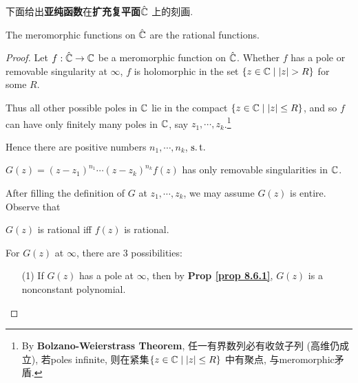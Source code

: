 	\vspace{2em}
	下面给出\textbf{亚纯函数}在\textbf{扩充复平面$\hat{\mathbb{C}}$} 上的刻画.
	\begin{thm}\label{thm 9.1.1}
		The meromorphic functions on $\hat{\mathbb{C}}$ are the rational functions.
		
		\vspace{4em}
		\begin{proof}
			Let $f : \hat{\mathbb{C}} \rightarrow \mathbb{C}$ be a meromorphic function on $\hat{\mathbb{C}}$. Whether $f$ has a pole or removable singularity at $\infty$, $f$ is holomorphic in the set $\{ z \in \mathbb{C} \mid \left| z \right| > R \}$ for some $R$. 
			
			\vspace{1em}
			
			Thus all other possible poles in $\mathbb{C}$ lie in the compact $\{ z \in \mathbb{C} \mid \left| z \right| \leq R \}$, and so $f$ can have only finitely many poles in $\mathbb{C}$, say $z_1 , \cdots , z_k$.\footnote{By \textbf{Bolzano-Weierstrass Theorem}, 任一有界数列必有收敛子列 (高维仍成立), 若poles infinite, 则在紧集$\{ z \in \mathbb{C} \mid \left| z \right| \leq R \}$ 中有聚点, 与meromorphic矛盾.}
			
			\newpage
			
			Hence there are positive numbers $n_1 , \cdots , n_k$, $\operatorname{s.t.}$
			\begin{center}
				$G(z) = (z - z_1)^{n_1} \cdots (z - z_k)^{n_k} f(z)$ has only removable singularities in $\mathbb{C}$.
			\end{center}
		
			\vspace{1em}
			
			After filling the definition of $G$ at $z_1 , \cdots , z_k$, we may assume $G(z)$ is entire. Observe that 
			\begin{center}
				$G(z)$ is rational \hspace*{1em} iff \hspace*{1em} $f(z)$ is rational.
			\end{center}
			For $G(z)$ at $\infty$, there are 3 possibilities:
			
			\vspace{1em}
			
			\begin{enumerate}
				\item[(1)]If $G(z)$ has a pole at $\infty$, then by \textbf{Prop \ref{prop 8.6.1}}, $G(z)$ is a nonconstant polynomial.
				
				\vspace{1em}
				

\end{enumerate}
\end{proof}
\end{thm}
